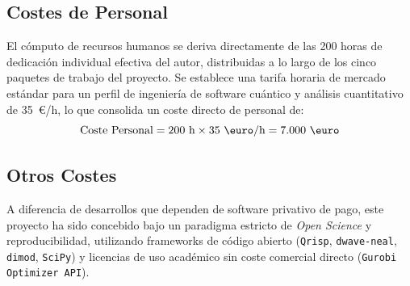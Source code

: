 \subsection{Costes de Personal}
\label{subsec:costes_personal}

El cómputo de recursos humanos se deriva directamente de las 200 horas de dedicación 
individual efectiva del autor, distribuidas a lo largo de los cinco paquetes de 
trabajo del proyecto. Se establece una tarifa horaria de mercado estándar para un 
perfil de ingeniería de software cuántico y análisis cuantitativo de 35~\euro/h, 
lo que consolida un coste directo de personal de:
\begin{equation}
    \text{Coste Personal} = 200\text{ h} \times 35\text{ \euro/h} = 7.000\text{ \euro}
\end{equation}

\subsection{Otros Costes}
\label{subsec:costes_infraestructura}

A diferencia de desarrollos que dependen de software privativo de pago, este proyecto 
ha sido concebido bajo un paradigma estricto de \textit{Open Science} y reproducibilidad, 
utilizando frameworks de código abierto (\texttt{Qrisp}, \texttt{dwave-neal}, \texttt{dimod}, 
\texttt{SciPy}) y licencias de uso académico sin coste comercial directo (\texttt{Gurobi Optimizer API}). 

